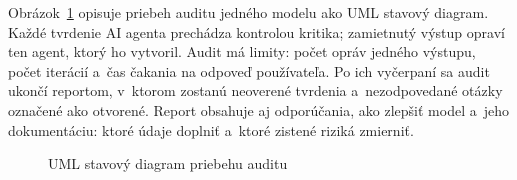 Obrázok~\ref{fig:pipeline} opisuje priebeh auditu jedného modelu ako UML
stavový diagram. Každé tvrdenie AI agenta prechádza kontrolou kritika;
zamietnutý výstup opraví ten agent, ktorý ho vytvoril. Audit má limity:
počet opráv jedného výstupu, počet iterácií a~čas čakania na odpoveď
používateľa. Po ich vyčerpaní sa audit ukončí reportom, v~ktorom zostanú
neoverené tvrdenia a~nezodpovedané otázky označené ako otvorené. Report
obsahuje aj odporúčania, ako zlepšiť model a~jeho dokumentáciu: ktoré
údaje doplniť a~ktoré zistené riziká zmierniť.

\begin{figure}[ht]
\centering

\caption{UML stavový diagram priebehu auditu}
\label{fig:pipeline}
\end{figure}
